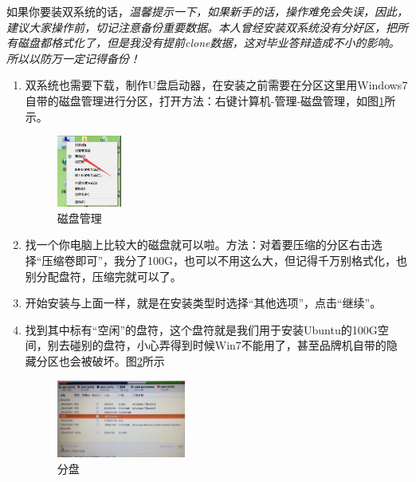 \documentclass{article}
\begin{document}
如果你要装双系统的话，\textsl{{\color{red}温馨提示一下}，{\color{blue}如果新手的话，操作难免会失误，因此，建议大家操作前，切记注意备份重要数据。本人曾经安装双系统没有分好区，把所有磁盘都格式化了，但是我没有提前clone数据，这对毕业答辩造成不小的影响。所以以防万一定记得备份！}}
\begin{enumerate}
\item 双系统也需要下载，制作U盘启动器，在安装之前需要在分区这里用Windows7自带的磁盘管理进行分区，打开方法：右键计算机-管理-磁盘管理，如图\ref{tu21}所示。
\begin{figure}[!htb] %
\centering
\includegraphics[width=0.2\textwidth]{tu21.jpeg}
\caption{\small 磁盘管理}
\label{tu21}
\end{figure} 

\item 找一个你电脑上比较大的磁盘就可以啦。方法：对着要压缩的分区右击选择“压缩卷即可”，我分了100G，也可以不用这么大，但记得千万别格式化，也别分配盘符，压缩完就可以了。

\item 开始安装与上面一样，就是在安装类型时选择“其他选项”，点击“继续”。

\item 找到其中标有“空闲”的盘符，这个盘符就是我们用于安装Ubuntu的100G空间，别去碰别的盘符，小心弄得到时候Win7不能用了，甚至品牌机自带的隐藏分区也会被破坏。图\ref{tu23}所示
\begin{figure}[!htb] %
\centering
\includegraphics[width=0.4\textwidth]{tu23.jpeg}
\caption{\small 分盘}
\label{tu23}
\end{figure} 


\end{enumerate}
\end{document}
